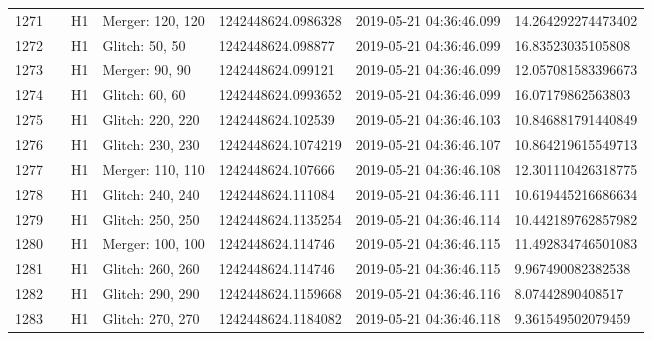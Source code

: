 \begin{longtable}{lllllll}
1271 &                                                    &       H1 &  Merger: 120, 120 &  1242448624.0986328 &  2019-05-21 04:36:46.099 &  14.264292274473402 \\
1272 &                                                    &       H1 &    Glitch: 50, 50 &   1242448624.098877 &  2019-05-21 04:36:46.099 &   16.83523035105808 \\
1273 &                                                    &       H1 &    Merger: 90, 90 &   1242448624.099121 &  2019-05-21 04:36:46.099 &  12.057081583396673 \\
1274 &                                                    &       H1 &    Glitch: 60, 60 &  1242448624.0993652 &  2019-05-21 04:36:46.099 &   16.07179862563803 \\
1275 &                                                    &       H1 &  Glitch: 220, 220 &   1242448624.102539 &  2019-05-21 04:36:46.103 &  10.846881791440849 \\
1276 &                                                    &       H1 &  Glitch: 230, 230 &  1242448624.1074219 &  2019-05-21 04:36:46.107 &  10.864219615549713 \\
1277 &                                                    &       H1 &  Merger: 110, 110 &   1242448624.107666 &  2019-05-21 04:36:46.108 &  12.301110426318775 \\
1278 &                                                    &       H1 &  Glitch: 240, 240 &   1242448624.111084 &  2019-05-21 04:36:46.111 &  10.619445216686634 \\
1279 &                                                    &       H1 &  Glitch: 250, 250 &  1242448624.1135254 &  2019-05-21 04:36:46.114 &  10.442189762857982 \\
1280 &                                                    &       H1 &  Merger: 100, 100 &   1242448624.114746 &  2019-05-21 04:36:46.115 &  11.492834746501083 \\
1281 &                                                    &       H1 &  Glitch: 260, 260 &   1242448624.114746 &  2019-05-21 04:36:46.115 &   9.967490082382538 \\
1282 &                                                    &       H1 &  Glitch: 290, 290 &  1242448624.1159668 &  2019-05-21 04:36:46.116 &    8.07442890408517 \\
1283 &                                                    &       H1 &  Glitch: 270, 270 &  1242448624.1184082 &  2019-05-21 04:36:46.118 &   9.361549502079459 \\

\end{longtable}

